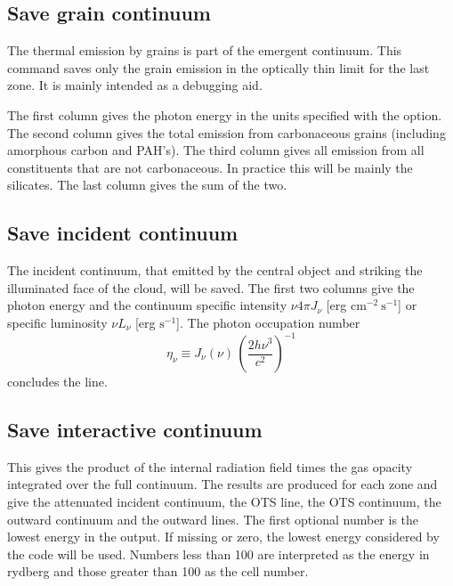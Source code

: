 \subsection{Save grain continuum}

The thermal emission by grains is part of the emergent continuum.  This
command saves only the grain emission in the optically thin limit for
the last zone.  It is mainly intended as a debugging aid.

The first column gives the photon energy in the units specified with
the  option.  The second column gives the total emission from
carbonaceous grains (including amorphous carbon and PAH's).  The third column
gives all emission from all constituents that are not carbonaceous.  In
practice this will be mainly the silicates.  The last column gives the sum
of the two.

\subsection{Save incident continuum}
\label{sec:CommandSaveIncidentContinuum}

The incident continuum, that emitted by the central object and striking
the illuminated face of the cloud, will be saved.  The first two columns give
the photon energy and the continuum specific intensity 
$\nu 4\pi J_{\nu}$ [erg cm$^{-2}\ \mathrm{s}^{-1}$] 
or specific luminosity 
$\nu L_{\nu}$ [erg  $\mathrm{s}^{-1}$].
The photon occupation number 
\begin{equation}
{\eta _\nu } \equiv {J_\nu }\left( \nu  \right)\,{\left( {\frac{{2h{\nu
^3}}}{{{c^2}}}} \right)^{ - 1}}
\end{equation}
concludes the line.

\subsection{Save interactive continuum}

This gives the product of the internal radiation field times the gas opacity integrated over the full continuum.  
The results are produced for each zone and give
the attenuated incident continuum, the OTS line, the OTS continuum, the
outward continuum and the outward lines.  The first optional number is the
lowest energy in the output.  If missing or zero, the lowest energy
considered by the code will be used.  Numbers less than 100 are interpreted
as the energy in rydberg and those greater than 100 as the cell number.

